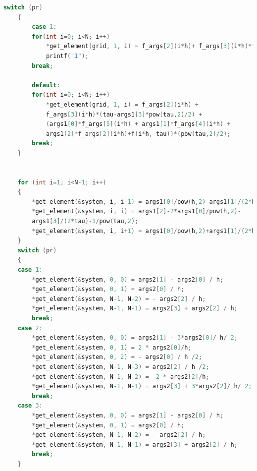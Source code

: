 \documentclass[12pt]{article}
\begin{document}
\begin{enumerate}
\begin{lstlisting}[language=C]
    switch (pr)
    {
        case 1: 
        for(int i=0; i<N; i++)
            *get_element(grid, 1, i) = f_args[2](i*h)+ f_args[3](i*h)*tau;
            printf("1");
        break;

        default:
        for(int i=0; i<N; i++)
            *get_element(grid, 1, i) = f_args[2](i*h) + 
            f_args[3](i*h)*(tau-args1[3]*pow(tau,2)/2) + 
            (args1[0]*f_args[5](i*h) + args1[1]*f_args[4](i*h) + 
            args1[2]*f_args[2](i*h)+f(i*h, tau))*(pow(tau,2)/2);
        break;
    }


    for (int i=1; i<N-1; i++)
    {
        *get_element(&system, i, i-1) = args1[0]/pow(h,2)-args1[1]/(2*h);
        *get_element(&system, i, i) = args1[2]-2*args1[0]/pow(h,2)-
        args1[3]/(2*tau)-1/pow(tau,2);
        *get_element(&system, i, i+1) = args1[0]/pow(h,2)+args1[1]/(2*h);
    }
    switch (pr)
    {
    case 1:
        *get_element(&system, 0, 0) = args2[1] - args2[0] / h;
        *get_element(&system, 0, 1) = args2[0] / h;
        *get_element(&system, N-1, N-2) = - args2[2] / h;
        *get_element(&system, N-1, N-1) = args2[3] + args2[2] / h;
        break;
    case 2:
        *get_element(&system, 0, 0) = args2[1] - 3*args2[0]/ h/ 2;
        *get_element(&system, 0, 1) = 2 * args2[0]/h;
        *get_element(&system, 0, 2) = - args2[0] / h /2;
        *get_element(&system, N-1, N-3) = args2[2] / h /2;
        *get_element(&system, N-1, N-2) = -2 * args2[2]/h;
        *get_element(&system, N-1, N-1) = args2[3] + 3*args2[2]/ h/ 2;
        break;
    case 3:
        *get_element(&system, 0, 0) = args2[1] - args2[0] / h;
        *get_element(&system, 0, 1) = args2[0] / h;
        *get_element(&system, N-1, N-2) = - args2[2] / h;
        *get_element(&system, N-1, N-1) = args2[3] + args2[2] / h;
        break;
    }


\end{lstlisting}
\end{enumerate}
\end{document}
